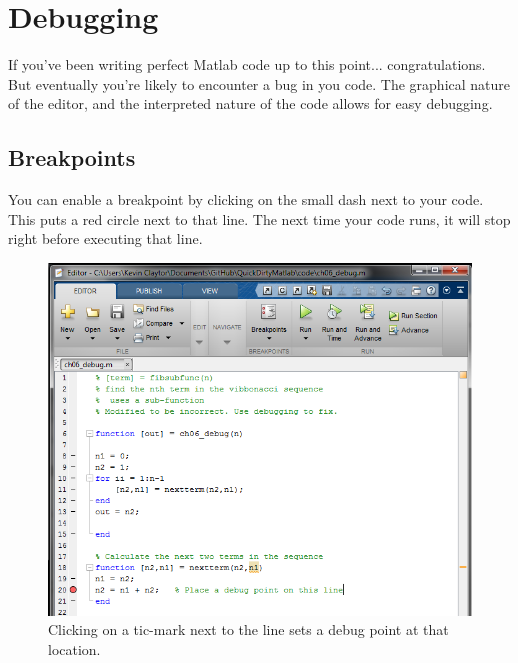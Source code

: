 
\pagebreak
\section{Debugging}
If you've been writing perfect Matlab code up to this point... congratulations.
 But eventually you're likely to encounter a bug in you code.
 The graphical nature of the editor, and the interpreted nature of the code allows for easy debugging.

\subsection{Breakpoints}
You can enable a breakpoint by clicking on the small dash next to your code.
 This puts a red circle next to that line.
 The next time your code runs, it will stop right before executing that line.

\begin{figure}[ht!]
\centering
\includegraphics[width=120mm]{img/debug1.png}
\caption{Clicking on a tic-mark next to the line sets a debug point at that location.}
\label{guiload}
\end{figure}

